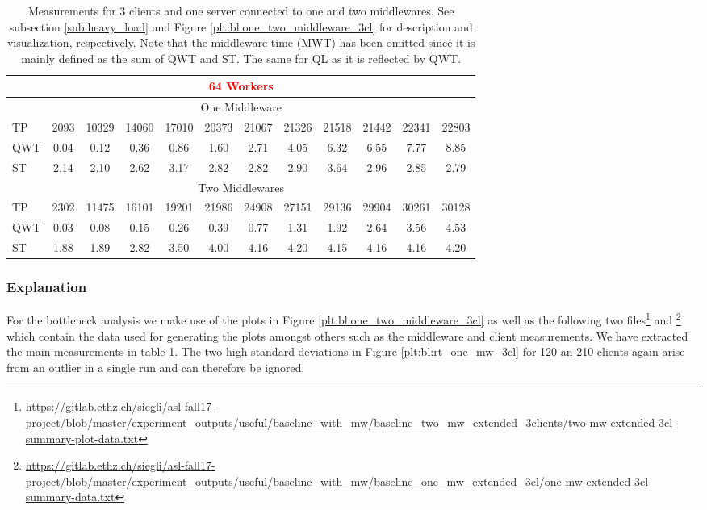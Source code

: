 \documentclass[11pt,a4paper]{article}
\let\tb\textbf
\begin{document}
\begin{table}[H]
\begin{center}
{{\begin{tabular}{|l||c|c|c|c|c|c|c|c|c|c|c|}
        \multicolumn{12}{|c|}{\textcolor{Red}{\tb{64 Workers}}}        \\ \hline
        \multicolumn{12}{|c|}{One Middleware} \\ \hline
        TP      &       2093   &    10329  &     14060  &     17010   &    20373   &    21067   &    21326  &     21518    &   21442    &   22341  &     22803 \\ \hline
        QWT     &       0.04  &      0.12  &      0.36  &      0.86   &     1.60   &     2.71   &     4.05   &     6.32    &    6.55   &     7.77  &      8.85 \\ \hline
        ST      &       2.14     &    2.10      &   2.62      &   3.17       &  2.82     &    2.82      &   2.90    &     3.64       &  2.96     &    2.85      &   2.79 \\ \hline
        \multicolumn{12}{|c|}{Two Middlewares} \\ \hline
        TP        &     2302  &     11475   &    16101  &     19201      & 21986   &    24908    &   27151   &    29136  &     29904  &     30261   &    30128 \\ \hline
        QWT       &     0.03    &    0.08   &     0.15   &     0.26      &  0.39   &     0.77  &      1.31    &    1.92  &      2.64    &    3.56    &    4.53 \\ \hline
        ST         &    1.88    &    1.89 &       2.82   &     3.50       & 4.00   &     4.16    &    4.20    &    4.15   &     4.16     &   4.16    &    4.20 \\ \hline
		\end{tabular}
		}
	} 
\end{center}
\caption{Measurements for 3 clients and one server connected to one and two middlewares. See subsection \ref{sub:heavy_load} and Figure \ref{plt:bl:one_two_middleware_3cl} for description and visualization, respectively. Note that the middleware time (MWT) has been omitted since it is mainly defined as the sum of QWT and ST. The same for QL as it is reflected by QWT.}
\label{tbl:bl:one_two_mw_comparison}
\end{table}


\subsubsection{Explanation}
For the bottleneck analysis we make use of the plots in Figure \ref{plt:bl:one_two_middleware_3cl} as well as the following two files\footnote{\url{https://gitlab.ethz.ch/siegli/asl-fall17-project/blob/master/experiment_outputs/useful/baseline_with_mw/baseline_two_mw_extended_3clients/two-mw-extended-3cl-summary-plot-data.txt}} and \footnote{\url{https://gitlab.ethz.ch/siegli/asl-fall17-project/blob/master/experiment_outputs/useful/baseline_with_mw/baseline_one_mw_extended_3cl/one-mw-extended-3cl-summary-data.txt}} which contain the data used for generating the plots amongst others such as the middleware and client measurements. We have extracted the main measurements in table \ref{tbl:bl:one_two_mw_comparison}. The two high standard deviations in Figure \ref{plt:bl:rt_one_mw_3cl} for 120 an 210 clients again arise from an outlier in a single run and can therefore be ignored.
\end{document}
